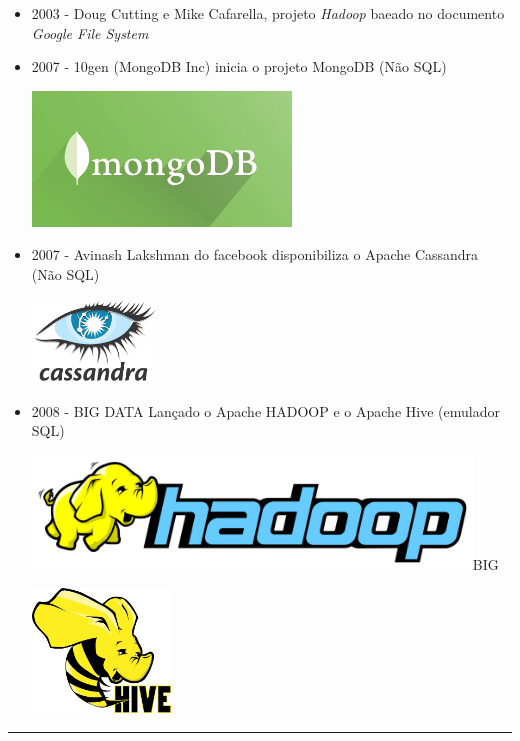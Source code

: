 \documentclass[
]{book}
\begin{document}
\begin{itemize}
\item
  2003 - Doug Cutting e Mike Cafarella, projeto \emph{Hadoop} baeado no documento \emph{Google File System}
\item
  2007 - 10gen (MongoDB Inc) inicia o projeto MongoDB (Não SQL)

  \includegraphics[width=2.70833in,height=\textheight]{images/2025-08-11/11-mongodb.png}
\item
  2007 - Avinash Lakshman do facebook disponibiliza o Apache Cassandra (Não SQL)

  \includegraphics[width=1.3125in,height=\textheight]{images/2025-08-11/12-cassandra.png}
\item
  2008 - BIG DATA Lançado o Apache HADOOP e o Apache Hive (emulador SQL)

  \includegraphics[width=4.59375in,height=\textheight]{images/2025-08-11/13-hadoop.png}BIG

  \includegraphics[width=1.44792in,height=\textheight]{images/2025-08-11/14-Apache_Hive.png}
\end{itemize}

\begin{center}\rule{0.5\linewidth}{0.5pt}\end{center}
\end{document}
